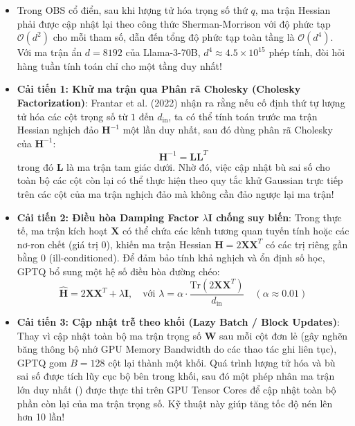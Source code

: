 \begin{itemize}
  \item Trong OBS cổ điển, sau khi lượng tử hóa trọng số thứ $q$, ma trận Hessian phải được cập nhật lại theo công thức Sherman-Morrison với độ phức tạp $\mathcal{O}(d^2)$ cho mỗi tham số, dẫn đến tổng độ phức tạp toàn tầng là $\mathcal{O}(d^4)$. Với ma trận ẩn $d = 8192$ của Llama-3-70B, $d^4 \approx 4.5 \times 10^{15}$ phép tính, đòi hỏi hàng tuần tính toán chỉ cho một tầng duy nhất!
  \item \textbf{Cải tiến 1: Khử ma trận qua Phân rã Cholesky (Cholesky Factorization)}:
  Frantar et al. (2022) nhận ra rằng nếu cố định thứ tự lượng tử hóa các cột trọng số từ $1$ đến $d_{\text{in}}$, ta có thể tính toán trước ma trận Hessian nghịch đảo $\mathbf{H}^{-1}$ một lần duy nhất, sau đó dùng phân rã Cholesky của $\mathbf{H}^{-1}$:
  \begin{equation}
  \mathbf{H}^{-1} = \mathbf{L} \mathbf{L}^T
  \end{equation}
  trong đó $\mathbf{L}$ là ma trận tam giác dưới. Nhờ đó, việc cập nhật bù sai số cho toàn bộ các cột còn lại có thể thực hiện theo quy tắc khử Gaussian trực tiếp trên các cột của ma trận nghịch đảo mà không cần đảo ngược lại ma trận!
  \item \textbf{Cải tiến 2: Điều hòa Damping Factor $\lambda \mathbf{I}$ chống suy biến}:
  Trong thực tế, ma trận kích hoạt $\mathbf{X}$ có thể chứa các kênh tương quan tuyến tính hoặc các nơ-ron chết (giá trị 0), khiến ma trận Hessian $\mathbf{H} = 2 \mathbf{X} \mathbf{X}^T$ có các trị riêng gần bằng $0$ (ill-conditioned). Để đảm bảo tính khả nghịch và ổn định số học, GPTQ bổ sung một hệ số điều hòa đường chéo:
  \begin{equation}
  \widehat{\mathbf{H}} = 2 \mathbf{X} \mathbf{X}^T + \lambda \mathbf{I}, \quad \text{với } \lambda = \alpha \cdot \frac{\text{Tr}(2 \mathbf{X} \mathbf{X}^T)}{d_{\text{in}}} \quad (\alpha \approx 0.01)
  \end{equation}
  \item \textbf{Cải tiến 3: Cập nhật trễ theo khối (Lazy Batch / Block Updates)}:
  Thay vì cập nhật toàn bộ ma trận trọng số $\mathbf{W}$ sau mỗi cột đơn lẻ (gây nghẽn băng thông bộ nhớ GPU Memory Bandwidth do các thao tác ghi liên tục), GPTQ gom $B = 128$ cột lại thành một khối. Quá trình lượng tử hóa và bù sai số được tích lũy cục bộ bên trong khối, sau đó một phép nhân ma trận lớn duy nhất () được thực thi trên GPU Tensor Cores để cập nhật toàn bộ phần còn lại của ma trận trọng số. Kỹ thuật này giúp tăng tốc độ nén lên hơn 10 lần!
\end{itemize}

